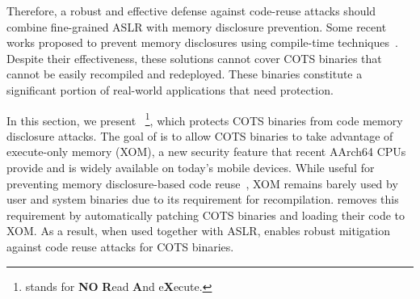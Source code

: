 Therefore, a robust and effective defense against code-reuse attacks should combine fine-grained ASLR with memory disclosure prevention. 
Some recent works proposed to prevent memory disclosures using compile-time techniques~\cite{readactor,readactorpluplu,lr2}. Despite their effectiveness, these solutions cannot cover COTS binaries that cannot be easily recompiled and redeployed. These binaries constitute a significant portion of real-world applications that need protection. 


In this section, we present \NORAX~\footnote{\NORAX stands for \textbf{NO}
\textbf{R}ead \textbf{A}nd e\textbf{X}ecute.}, which protects COTS binaries from code memory disclosure attacks. 
The goal of \NORAX is to allow COTS binaries to take advantage of execute-only memory (XOM), a new security feature that recent AArch64 CPUs provide and is widely available on today's mobile devices. 
While useful for preventing memory disclosure-based code reuse~\cite{jitrop, brop}, XOM remains barely used by user and system binaries due to its requirement for recompilation. 
\NORAX removes this requirement by automatically patching COTS binaries and loading their code to XOM. As a result, when used together with ASLR, \NORAX enables robust mitigation against code reuse attacks for COTS binaries.


